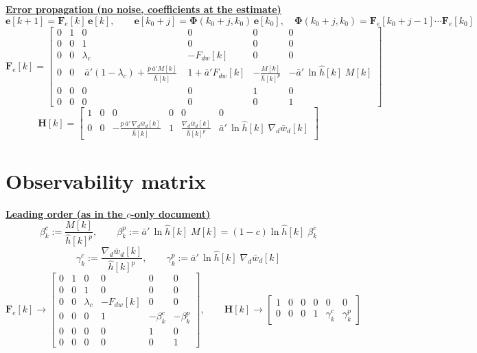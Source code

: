 \documentclass[11pt,a4paper]{ctexart}
\newcommand{\lc}{\lambda_c}
\newcommand{\ba}{\bar{a}}
\newcommand{\bw}{\bar{w}}
\newcommand{\ap}{\ba'}
\newcommand{\hh}{\hat{h}}
\newcommand{\hd}[1]{\par\bigskip\noindent\underline{\textbf{#1}}}
\begin{document}
\hd{Error propagation (no noise, coefficients at the estimate)}
\[
\mathbf{e}[k+1] = \mathbf{F}_e[k]\,\mathbf{e}[k], \qquad
\mathbf{e}[k_0+j] = \bm{\Phi}(k_0+j,k_0)\,\mathbf{e}[k_0], \quad \bm{\Phi}(k_0+j,k_0) = \mathbf{F}_e[k_0+j-1]\cdots\mathbf{F}_e[k_0]
\]
{\small
\[
\mathbf{F}_e[k] =
\begin{bmatrix}
0 & 1 & 0 & 0 & 0 & 0 \\
0 & 0 & 1 & 0 & 0 & 0 \\
0 & 0 & \lc & -F_{dw}[k] & 0 & 0 \\
0 & 0 & \;\ap(1-\lc) + \frac{p\,\ap M[k]}{\hh[k]}\; & 1 + \ap F_{dw}[k] & -\frac{M[k]}{\hh[k]^{p}} & -\ap\,\ln\hh[k]\;M[k] \\
0 & 0 & 0 & 0 & 1 & 0 \\
0 & 0 & 0 & 0 & 0 & 1
\end{bmatrix}
\]
\[
\mathbf{H}[k] =
\begin{bmatrix}
1 & 0 & 0 & 0 & 0 & 0 \\
0 & 0 & -\frac{p\,\ap\,\nabla_d\bw_d[k]}{\hh[k]} & 1 & \frac{\nabla_d\bw_d[k]}{\hh[k]^{p}} & \ap\,\ln\hh[k]\;\nabla_d\bw_d[k]
\end{bmatrix}
\]
}

\clearpage
\section{Observability matrix}

\hd{Leading order (as in the $c$-only document)}
\[
\beta^{c}_k := \frac{M[k]}{\hh[k]^{p}}, \qquad
\beta^{p}_k := \ap\,\ln\hh[k]\;M[k] = (1-c)\ln\hh[k]\;\beta^{c}_k
\]
\[
\gamma^{c}_k := \frac{\nabla_d\bw_d[k]}{\hh[k]^{p}}, \qquad
\gamma^{p}_k := \ap\,\ln\hh[k]\;\nabla_d\bw_d[k]
\]
\[
\mathbf{F}_e[k] \to
\begin{bmatrix}
0 & 1 & 0 & 0 & 0 & 0 \\
0 & 0 & 1 & 0 & 0 & 0 \\
0 & 0 & \lc & -F_{dw}[k] & 0 & 0 \\
0 & 0 & 0 & 1 & -\beta^{c}_k & -\beta^{p}_k \\
0 & 0 & 0 & 0 & 1 & 0 \\
0 & 0 & 0 & 0 & 0 & 1
\end{bmatrix}, \qquad
\mathbf{H}[k] \to
\begin{bmatrix}
1 & 0 & 0 & 0 & 0 & 0 \\
0 & 0 & 0 & 1 & \gamma^{c}_k & \gamma^{p}_k
\end{bmatrix}
\]
\end{document}
